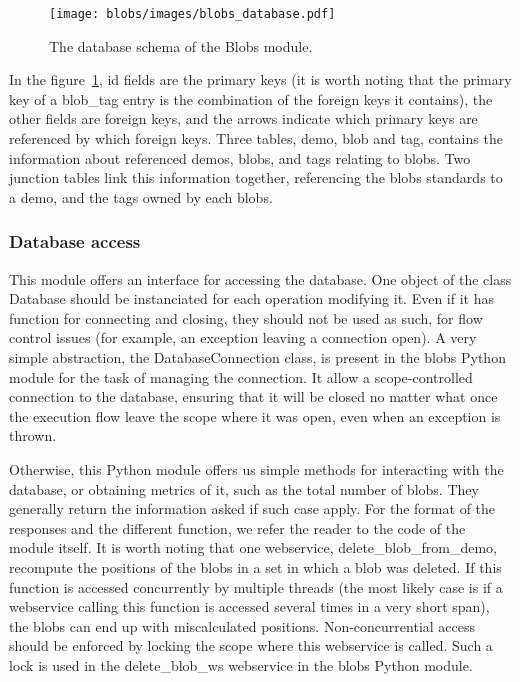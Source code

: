 \begin{figure}[h]
\centering
\texttt{[image: blobs/images/blobs\_database.pdf]}
\caption{The database schema of the Blobs module.}
\label{fig:blobs_database}
\end{figure}

In the figure~\ref{fig:blobs_database}, id fields are the primary keys (it is worth noting that the primary key of a blob\_tag entry is the combination of the foreign keys it contains), the other fields are foreign keys, and the arrows indicate which primary keys are referenced by which foreign keys.
Three tables, demo, blob and tag, contains the information about referenced demos, blobs, and tags relating to blobs. Two junction tables link this information together, referencing the blobs standards to a demo, and the tags owned by each blobs.

\subsubsection{Database access}
This module offers an interface for accessing the database. One object of the class Database should be instanciated for each operation modifying it. Even if it has function for connecting and closing, they should not be used as such, for flow control issues (for example, an exception leaving a connection open). A very simple abstraction, the DatabaseConnection class, is present in the blobs Python module for the task of managing the connection. It allow a scope-controlled connection to the database, ensuring that it will be closed no matter what once the execution flow leave the scope where it was open, even when an exception is thrown.

Otherwise, this Python module offers us simple methods for interacting with the database, or obtaining metrics of it, such as the total number of blobs. They generally return the information asked if such case apply. For the format of the responses and the different function, we refer the reader to the code of the module itself. It is worth noting that one webservice, delete\_blob\_from\_demo, recompute the positions of the blobs in a set in which a blob was deleted. If this function is accessed concurrently by multiple threads (the most likely case is if a webservice calling this function is accessed several times in a very short span), the blobs can end up with miscalculated positions. Non-concurrential access should be enforced by locking the scope where this webservice is called. Such a lock is used in the delete\_blob\_ws webservice in the blobs Python module.

